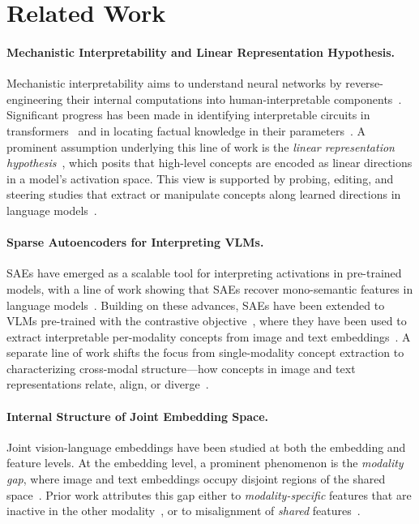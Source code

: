 \section{Related Work}

\paragraph{Mechanistic Interpretability and Linear Representation Hypothesis.}
Mechanistic interpretability aims to understand neural networks by reverse-engineering their internal computations into human-interpretable components~\citep{olah2020zoom, elhage2021mathematical}.
Significant progress has been made in identifying interpretable circuits in transformers~\citep{elhage2021mathematical, olsson2022context} and in locating factual knowledge in their parameters~\citep{meng2022locating}.
A prominent assumption underlying this line of work is the \emph{linear representation hypothesis}~\citep{park2024lrh, elhage2022toy}, which posits that high-level concepts are encoded as linear directions in a model's activation space.
This view is supported by probing, editing, and steering studies that extract or manipulate concepts along learned directions in language models~\citep{hewitt2019structural, turner2024activation, nanda2023emergent, li2023inference}.

\paragraph{Sparse Autoencoders for Interpreting VLMs.}
SAEs have emerged as a scalable tool for interpreting activations in pre-trained models, with a line of work showing that SAEs recover mono-semantic features in language models~\citep{huben2023sparse, lieberum2024gemma, templeton2024scaling, gao2025scaling, markssparse}.
Building on these advances, SAEs have been extended to VLMs pre-trained with the contrastive objective~\citep{radford21clip}, where they have been used to extract interpretable per-modality concepts from image and text embeddings~\citep{rao2024discover, zaigrajew2025interpreting, pach2026sparse}.
A separate line of work shifts the focus from single-modality concept extraction to characterizing cross-modal structure---how concepts in image and text representations relate, align, or diverge~\citep{costa2026from, kaushik2026learning, dhimoila2026crossmodal}.

\paragraph{Internal Structure of Joint Embedding Space.}
Joint vision-language embeddings have been studied at both the embedding and feature levels.
At the embedding level, a prominent phenomenon is the \emph{modality gap}, where image and text embeddings occupy disjoint regions of the shared space~\citep{liang2022mind}.
Prior work attributes this gap either to \emph{modality-specific} features that are inactive in the other modality~\citep{jiang2023understanding, zhang2024connect, ramasinghe2024accept, schrodi2025two, qian2023intra}, or to misalignment of \emph{shared} features~\citep{eslami2025mitigate, yamaguchi2025post, grassucci2025closing, grassucci2026closing, grassucci2026the, mistretta2025cross}.


